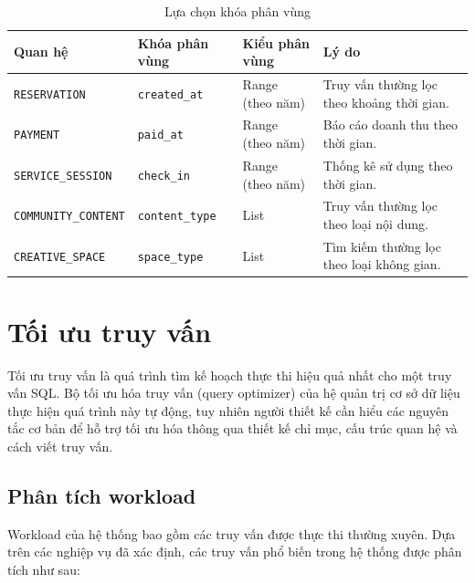 \begin{table}[htbp]
\centering
\begin{tabularx}{\linewidth}{|l|l|l|X|}
\hline
\textbf{Quan hệ} & \textbf{Khóa phân vùng} & \textbf{Kiểu phân vùng} & \textbf{Lý do} \\
\hline
\texttt{RESERVATION} & \texttt{created\_at} & Range (theo năm) & Truy vấn thường lọc theo khoảng thời gian. \\
\hline
\texttt{PAYMENT} & \texttt{paid\_at} & Range (theo năm) & Báo cáo doanh thu theo thời gian. \\
\hline
\texttt{SERVICE\_SESSION} & \texttt{check\_in} & Range (theo năm) & Thống kê sử dụng theo thời gian. \\
\hline
\texttt{COMMUNITY\_CONTENT} & \texttt{content\_type} & List & Truy vấn thường lọc theo loại nội dung. \\
\hline
\texttt{CREATIVE\_SPACE} & \texttt{space\_type} & List & Tìm kiếm thường lọc theo loại không gian. \\
\hline
\end{tabularx}
\caption{Lựa chọn khóa phân vùng}
\end{table}

\section{Tối ưu truy vấn}

Tối ưu truy vấn là quá trình tìm kế hoạch thực thi hiệu quả nhất cho một truy vấn SQL. Bộ tối ưu hóa truy vấn (query optimizer) của hệ quản trị cơ sở dữ liệu thực hiện quá trình này tự động, tuy nhiên người thiết kế cần hiểu các nguyên tắc cơ bản để hỗ trợ tối ưu hóa thông qua thiết kế chỉ mục, cấu trúc quan hệ và cách viết truy vấn.

\subsection{Phân tích workload}

Workload của hệ thống bao gồm các truy vấn được thực thi thường xuyên. Dựa trên các nghiệp vụ đã xác định, các truy vấn phổ biến trong hệ thống được phân tích như sau:

